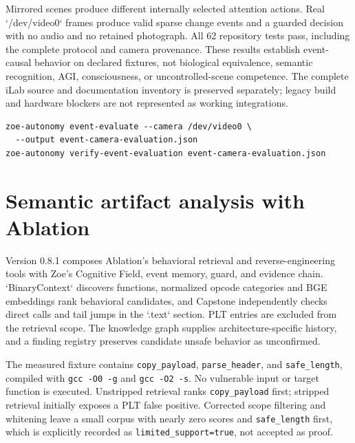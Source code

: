 \documentclass[11pt,a4paper]{article}
\begin{document}
Mirrored scenes produce different internally selected attention actions. Real `/dev/video0` frames produce valid sparse change events and a guarded decision with no audio and no retained photograph. All 62 repository tests pass, including the complete protocol and camera provenance. These results establish event-causal behavior on declared fixtures, not biological equivalence, semantic recognition, AGI, consciousness, or uncontrolled-scene competence. The complete iLab source and documentation inventory is preserved separately; legacy build and hardware blockers are not represented as working integrations.

\begin{lstlisting}
zoe-autonomy event-evaluate --camera /dev/video0 \
  --output event-camera-evaluation.json
zoe-autonomy verify-event-evaluation event-camera-evaluation.json
\end{lstlisting}


\section{Semantic artifact analysis with Ablation}
Version 0.8.1 composes Ablation's behavioral retrieval and reverse-engineering tools with Zoe's Cognitive Field, event memory, guard, and evidence chain. `BinaryContext` discovers functions, normalized opcode categories and BGE embeddings rank behavioral candidates, and Capstone independently checks direct calls and tail jumps in the `.text` section. PLT entries are excluded from the retrieval scope. The knowledge graph supplies architecture-specific history, and a finding registry preserves candidate unsafe behavior as unconfirmed.

The measured fixture contains \texttt{copy\_payload}, \texttt{parse\_header}, and \texttt{safe\_length}, compiled with \texttt{gcc -O0 -g} and \texttt{gcc -O2 -s}. No vulnerable input or target function is executed. Unstripped retrieval ranks \texttt{copy\_payload} first; stripped retrieval initially exposes a PLT false positive. Corrected scope filtering and whitening leave a small corpus with nearly zero scores and \texttt{safe\_length} first, which is explicitly recorded as \texttt{limited\_support=true}, not accepted as proof.
\end{document}
